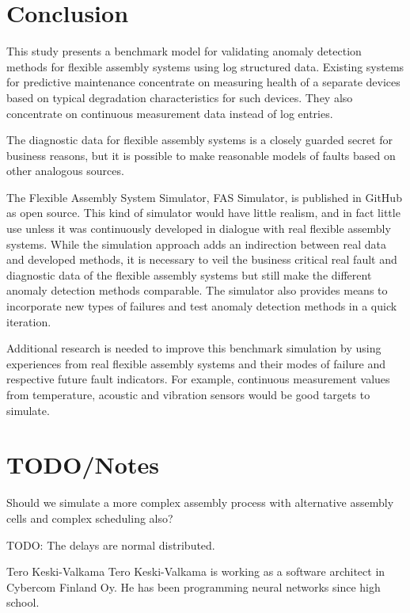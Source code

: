 \documentclass[journal]{IEEEtran}
\begin{document}
\section{Conclusion}

This study presents a benchmark model for validating anomaly detection methods for flexible assembly systems using log structured data.
Existing systems for predictive maintenance concentrate on measuring health of a separate devices based on typical degradation characteristics
for such devices. They also concentrate on continuous measurement data instead of log entries.

The diagnostic data for flexible assembly systems is a closely guarded secret for business reasons, but it is possible to make reasonable models
of faults based on other analogous sources.

The Flexible Assembly System Simulator, FAS Simulator, is published in GitHub \cite{FASSimulator} as open source. This kind of simulator would have
little realism, and in fact little use unless it was continuously developed in dialogue with real flexible assembly systems. While the simulation
approach adds an indirection between real data and developed methods, it is necessary to veil the business critical real fault and diagnostic
data of the flexible assembly systems but still make the different anomaly detection methods comparable. The simulator also provides means to incorporate new types of
failures and test anomaly detection methods in a quick iteration.

Additional research is needed to improve this benchmark simulation by using experiences from real flexible assembly systems and their modes of failure
and respective future fault indicators. For example, continuous measurement values from temperature, acoustic and vibration sensors would be good targets
to simulate.

\section{TODO/Notes}

Should we simulate a more complex assembly process with alternative assembly cells and complex scheduling also?

TODO: The delays are normal distributed.

\appendices




\begin{IEEEbiography}{Tero Keski-Valkama}
Tero Keski-Valkama is working as a software architect in Cybercom Finland Oy. He has been programming neural networks since high school.
\end{IEEEbiography}
\end{document}
